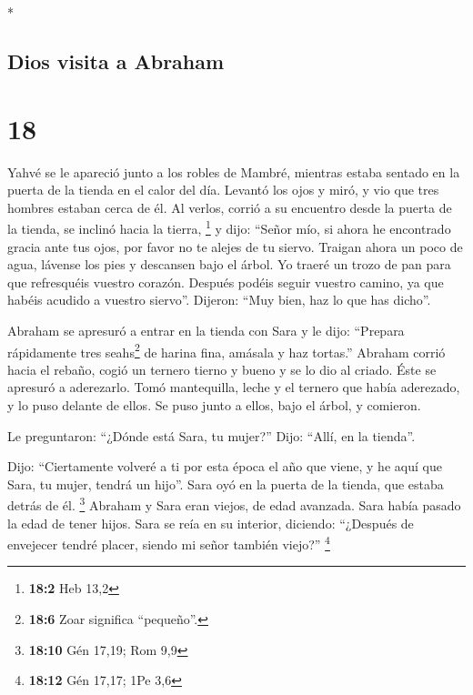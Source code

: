 \begin{paracol}{2}
\begin{otherlanguage}{english}
\end{otherlanguage}

\switchcolumn[0]*

\hypertarget{dios-visita-a-abraham}{%
\subsection{Dios visita a Abraham}\label{dios-visita-a-abraham}}

\hypertarget{section-34}{%
\section{18}\label{section-34}}

 Yahvé se le apareció junto a los robles de Mambré,
mientras estaba sentado en la puerta de la tienda en el calor del día.
 Levantó los ojos y miró, y vio que tres hombres estaban
cerca de él. Al verlos, corrió a su encuentro desde la puerta de la
tienda, se inclinó hacia la tierra, \footnote{\textbf{18:2} Heb 13,2}
 y dijo: ``Señor mío, si ahora he encontrado gracia ante
tus ojos, por favor no te alejes de tu siervo.  Traigan
ahora un poco de agua, lávense los pies y descansen bajo el árbol.
 Yo traeré un trozo de pan para que refresquéis vuestro
corazón. Después podéis seguir vuestro camino, ya que habéis acudido a
vuestro siervo''. Dijeron: ``Muy bien, haz lo que has dicho''.

 Abraham se apresuró a entrar en la tienda con Sara y le
dijo: ``Prepara rápidamente tres seahs\footnote{\textbf{18:6} Zoar
  significa ``pequeño''.} de harina fina, amásala y haz tortas.''
 Abraham corrió hacia el rebaño, cogió un ternero tierno y
bueno y se lo dio al criado. Éste se apresuró a aderezarlo.
 Tomó mantequilla, leche y el ternero que había aderezado,
y lo puso delante de ellos. Se puso junto a ellos, bajo el árbol, y
comieron.

 Le preguntaron: ``¿Dónde está Sara, tu mujer?'' Dijo:
``Allí, en la tienda''.

 Dijo: ``Ciertamente volveré a ti por esta época el año
que viene, y he aquí que Sara, tu mujer, tendrá un hijo''. Sara oyó en
la puerta de la tienda, que estaba detrás de él. \footnote{\textbf{18:10}
  Gén 17,19; Rom 9,9}  Abraham y Sara eran viejos, de
edad avanzada. Sara había pasado la edad de tener hijos. 
Sara se reía en su interior, diciendo: ``¿Después de envejecer tendré
placer, siendo mi señor también viejo?'' \footnote{\textbf{18:12} Gén
  17,17; 1Pe 3,6}


\end{paracol}

